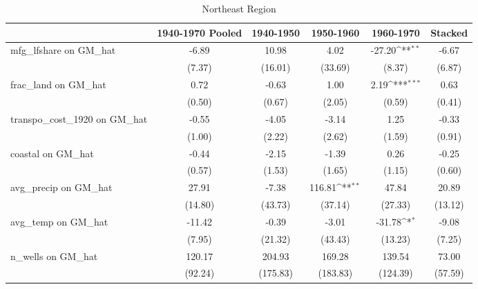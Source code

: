 \begin{table}[htbp]\centering
\def\sym#1{\ifmmode^{#1}\else\(^{#1}\)\fi}
\caption{Northeast Region}
\begin{tabular}{l*{5}{c}}
\toprule
                &\multicolumn{1}{c}{1940-1970 Pooled}&\multicolumn{1}{c}{1940-1950}&\multicolumn{1}{c}{1950-1960}&\multicolumn{1}{c}{1960-1970}&\multicolumn{1}{c}{Stacked}\\
\midrule
mfg\_lfshare on GM\_hat&    -6.89         &    10.98         &     4.02         &   -27.20\sym{**} &    -6.67         \\
                &   (7.37)         &  (16.01)         &  (33.69)         &   (8.37)         &   (6.87)         \\
\addlinespace
frac\_land on GM\_hat&     0.72         &    -0.63         &     1.00         &     2.19\sym{***}&     0.63         \\
                &   (0.50)         &   (0.67)         &   (2.05)         &   (0.59)         &   (0.41)         \\
\addlinespace
transpo\_cost\_1920 on GM\_hat&    -0.55         &    -4.05         &    -3.14         &     1.25         &    -0.33         \\
                &   (1.00)         &   (2.22)         &   (2.62)         &   (1.59)         &   (0.91)         \\
\addlinespace
coastal on GM\_hat&    -0.44         &    -2.15         &    -1.39         &     0.26         &    -0.25         \\
                &   (0.57)         &   (1.53)         &   (1.65)         &   (1.15)         &   (0.60)         \\
\addlinespace
avg\_precip on GM\_hat&    27.91         &    -7.38         &   116.81\sym{**} &    47.84         &    20.89         \\
                &  (14.80)         &  (43.73)         &  (37.14)         &  (27.33)         &  (13.12)         \\
\addlinespace
avg\_temp on GM\_hat&   -11.42         &    -0.39         &    -3.01         &   -31.78\sym{*}  &    -9.08         \\
                &   (7.95)         &  (21.32)         &  (43.43)         &  (13.23)         &   (7.25)         \\
\addlinespace
n\_wells on GM\_hat&   120.17         &   204.93         &   169.28         &   139.54         &    73.00         \\
                &  (92.24)         & (175.83)         & (183.83)         & (124.39)         &  (57.59)         \\

\end{tabular}
\end{table}
